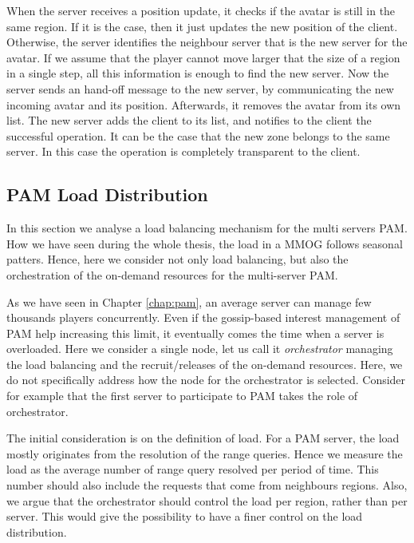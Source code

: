\documentclass[final,10pt,a5paper]{phdimt}
\theoremstyle{definition}
\begin{document}
When the server receives a position update, it checks if the avatar is still in the same region. 
If it is the case, then it just updates the new position of the client.
Otherwise, the server identifies the neighbour server that is the new server for the avatar.
If we assume that the player cannot move larger that the size of a region in a single step, all this information is enough to find the new server. 
Now the server sends an hand-off message to the new server, by communicating the new incoming avatar and its position.
Afterwards, it removes the avatar from its own list. The new server adds the client to its list, and notifies to the client the successful operation. 
It can be the case that the new zone belongs to the same server. In this case the operation is completely transparent to the client.




\subsection{PAM Load Distribution}

In this section we analyse a load balancing mechanism for the multi servers PAM.
How we have seen during the whole thesis, the load in a MMOG follows seasonal patters.
Hence, here we consider not only load balancing, but also the orchestration of the on-demand resources for the multi-server PAM.


As we have seen in Chapter \ref{chap:pam}, an average server can manage few thousands players concurrently.
Even if the gossip-based interest management of PAM help increasing this limit, it eventually comes the time when a server is overloaded.
Here we consider a single node, let us call it \textit{orchestrator} managing  the load balancing and the recruit/releases of the on-demand resources. 
Here, we do not specifically address how the node for the orchestrator is selected. Consider for example that the first server to participate to PAM takes the role of orchestrator.

The initial consideration is on the definition of load.
For a PAM server, the load mostly originates from the resolution of the range queries.
Hence we measure the load as the average number of range query resolved per period of time.
This number should also include the requests that come from neighbours regions.
Also, we argue that the orchestrator should control the load per region, rather than per server.
This would give the possibility to have a finer control on the load distribution.
\end{document}
